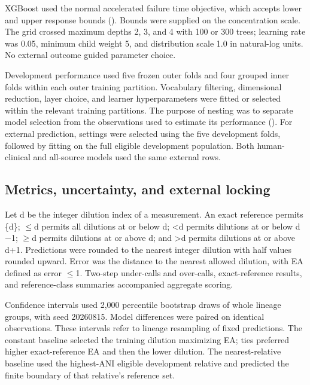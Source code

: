 \documentclass[
  american,
  11pt,
]{article}
\begin{document}
XGBoost used the normal accelerated failure time objective, which
accepts lower and upper response bounds
(). Bounds were
supplied on the concentration scale. The grid crossed maximum depths 2,
3, and 4 with 100 or 300 trees; learning rate was 0.05, minimum child
weight 5, and distribution scale 1.0 in natural-log units. No external
outcome guided parameter choice.

Development performance used five frozen outer folds and four grouped
inner folds within each outer training partition. Vocabulary filtering,
dimensional reduction, layer choice, and learner hyperparameters were
fitted or selected within the relevant training partitions. The purpose
of nesting was to separate model selection from the observations used to
estimate its performance (). For external prediction, settings were selected using the five
development folds, followed by fitting on the full eligible development
population. Both human-clinical and all-source models used the same
external rows.

\subsection{Metrics, uncertainty, and external
locking}\label{metrics-uncertainty-and-external-locking}

Let d be the integer dilution index of a measurement. An exact reference
permits \{d\}; \ensuremath{\leq}d permits all dilutions at or below d; \textless d
permits dilutions at or below d\ensuremath{-}1; \ensuremath{\geq}d permits dilutions at or above d;
and \textgreater d permits dilutions at or above d+1. Predictions were
rounded to the nearest integer dilution with half values rounded upward.
Error was the distance to the nearest allowed dilution, with EA defined
as error \ensuremath{\leq}1. Two-step under-calls and over-calls, exact-reference
results, and reference-class summaries accompanied aggregate scoring.

Confidence intervals used 2,000 percentile bootstrap draws of whole
lineage groups, with seed 20260815. Model differences were paired on
identical observations. These intervals refer to lineage resampling of
fixed predictions. The constant baseline selected the training dilution
maximizing EA; ties preferred higher exact-reference EA and then the
lower dilution. The nearest-relative baseline used the highest-ANI
eligible development relative and predicted the finite boundary of that
relative's reference set.
\end{document}
